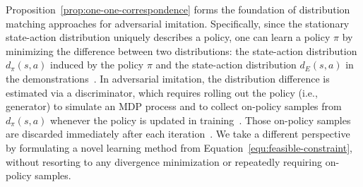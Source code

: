 \documentclass[letterpaper]{article} %
\begin{document}
Proposition~\ref{prop:one-one-correspondence} forms the foundation of distribution matching approaches for adversarial imitation. 
Specifically, since the stationary state-action distribution uniquely describes a policy, 
one can learn a policy $\pi$ by minimizing the difference between two distributions: the state-action distribution $d_{\pi}(s, a)$ induced by the policy $\pi$ and the state-action distribution $d_{E}(s, a)$ in the demonstrations~\cite{ho2016generative,kostrikov2018discriminator,ke2019imitation,ghasemipour2020divergence}.  
In adversarial imitation, the distribution difference is estimated via a discriminator, 
which requires rolling out the policy (i.e., generator) to simulate an MDP process and to collect on-policy samples from $d_{\pi}(s, a)$ whenever the policy is updated in training~\cite{ho2016generative}.
Those on-policy samples are discarded immediately after each iteration~\cite{kostrikov2018discriminator,kostrikov2019imitation}. 
We take a different perspective by formulating a novel learning method from Equation~\eqref{equ:feasible-constraint}, 
without resorting to any divergence minimization or repeatedly requiring on-policy samples. 
\end{document}
